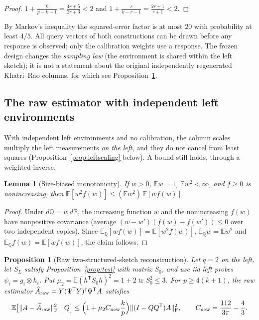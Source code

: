\documentclass[11pt,a4paper]{article}
\newtheorem{lemma}[theorem]{Lemma}
\newtheorem{proposition}[theorem]{Proposition}
\theoremstyle{definition}
\theoremstyle{remark}
\numberwithin{equation}{section}
\newcommand{\E}{\mathbb E}
\newcommand{\Prob}{\mathbb P}
\newcommand{\T}{{\mathsf T}}
\newcommand{\tr}{\operatorname{tr}}
\newcommand{\norm}[1]{\lVert#1\rVert}
\newcommand{\F}{\mathrm F}
\begin{document}
\begin{proof}
$1+\frac{k}{p-k-1}=\frac{4r+5}{2r+3}<2$ and $1+\frac r{k-r-1}=\frac{2r+1}{r+1}<2$.
\end{proof}

By Markov's inequality the squared-error factor is at most $20$ with
probability at least $4/5$. All query vectors of both constructions can be
drawn before any response is observed; only the calibration weights use a
response. The frozen design changes the \emph{sampling law} (the environment
is shared within the left sketch); it is not a statement about the original
independently regenerated Khatri--Rao columns, for which see
Proposition~\ref{prop:raw}.
\subsection{The raw estimator with independent left environments}

With independent left environments and no calibration, the column scales
multiply the left measurements \emph{on the left}, and they do not cancel from
least squares (Proposition~\ref{prop:leftscaling} below). A bound still holds,
through a weighted inverse.

\begin{lemma}[Size-biased monotonicity]\label{lem:monotone}
If $w>0$, $\E w=1$, $\E w^2<\infty$, and $f\ge0$ is nonincreasing, then
$\E[w^2f(w)]\le(\E w^2)\,\E[wf(w)]$.
\end{lemma}

\begin{proof}
Under $d\mathbb Q=w\,d\Prob$, the increasing function $w$ and the nonincreasing
$f(w)$ have nonpositive covariance (average $(w-w')(f(w)-f(w'))\le0$ over two
independent copies). Since $\E_{\mathbb Q}[wf(w)]=\E[w^2f(w)]$,
$\E_{\mathbb Q}w=\E w^2$ and $\E_{\mathbb Q}f(w)=\E[wf(w)]$, the claim follows.
\end{proof}

\begin{proposition}[Raw two-structured-sketch reconstruction]\label{prop:raw}
Let $q=2$ on the left, let $S_L$ satisfy Proposition~\ref{prop:test} with
matrix $S_0$, and use iid left probes $\psi_i=g_i\otimes h_i$. Put
$\mu_2=\E(h^\T S_0h)^2=1+2\tr S_0^2\le3$. For $p\ge4(k+1)$, the raw estimator
$\widehat A_{\rm raw}=Y(\Psi^\T Y)^\dagger\Psi^\T A$ satisfies
\[
 \E\bigl[\norm{A-\widehat A_{\rm raw}}_\F^2\bigm| Q\bigr]
 \le\Bigl(1+\mu_2C_{\rm new}\frac kp\Bigr)\norm{(I-QQ^\T)A}_\F^2,
 \qquad C_{\rm new}=\frac{112}{3\pi}-\frac43 .
\]
\end{proposition}
\end{document}
